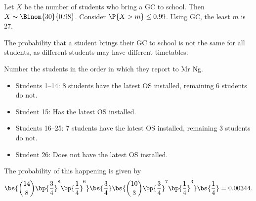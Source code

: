 \begin{solution}
    \begin{ppart}
        \begin{psubpart}
            Let $X$ be the number of students who bring a GC to school. Then $X \sim \Binom{30}{0.98}$. Consider $\P{X > m} \leq 0.99$. Using GC, the least $m$ is 27.
        \end{psubpart}
        \begin{psubpart}
            The probability that a student brings their GC to school is not the same for all students, as different students may have different timetables.
        \end{psubpart}
    \end{ppart}
    \begin{ppart}
        Number the students in the order in which they report to Mr Ng.
        \begin{itemize}
            \item Students 1--14: 8 students have the latest OS installed, remaining 6 students do not.
            \item Student 15: Has the latest OS installed.
            \item Students 16--25: 7 students have the latest OS installed, remaining 3 students do not.
            \item Student 26: Does not have the latest OS installed.
        \end{itemize}
        The probability of this happening is given by \[\bs{\binom{14}{8} \bp{\frac34}^8 \bp{\frac14}^6} \bs{\frac34} \bs{\binom{10}{3} \bp{\frac34}^7 \bp{\frac14}^3} \bs{\frac14} = 0.00344.\]
    \end{ppart}
\end{solution}

